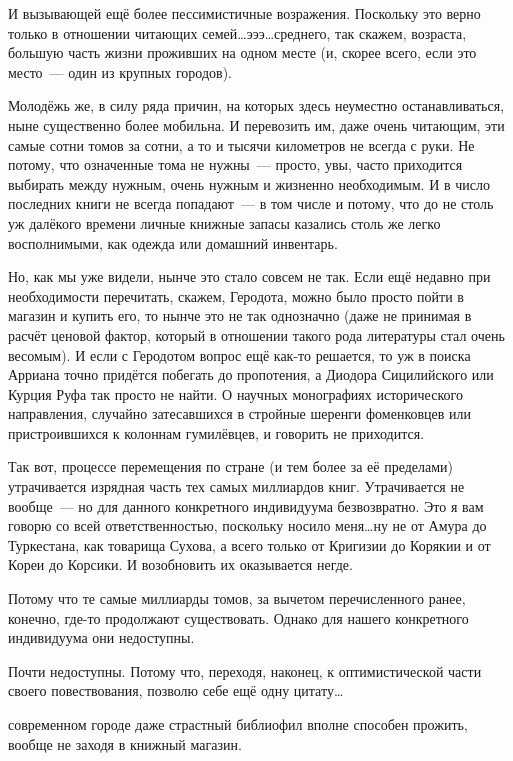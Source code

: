 И вызывающей ещё более пессимистичные возражения. Поскольку это верно только в отношении читающих семей\dots эээ\dots среднего, так скажем, возраста, большую часть жизни проживших на одном месте (и, скорее всего, если это место~--- один из крупных городов).

Молодёжь же, в силу ряда причин, на которых здесь неуместно останавливаться, ныне существенно более мобильна. И перевозить им, даже очень читающим, эти самые сотни томов за сотни, а то и тысячи километров не всегда с руки. Не потому, что означенные тома не нужны~--- просто, увы, часто приходится выбирать между нужным, очень нужным и жизненно необходимым. И в число последних книги не всегда попадают~--- в том числе и потому, что до не столь уж далёкого времени личные книжные запасы казались столь же легко восполнимыми, как одежда или домашний инвентарь.

Но, как мы уже видели, нынче это стало совсем не так. Если ещё недавно при необходимости перечитать, скажем, Геродота, можно было просто пойти в магазин и купить его, то нынче это не так однозначно (даже не принимая в расчёт ценовой фактор, который в отношении такого рода литературы стал очень весомым). И если с Геродотом вопрос ещё как-то решается, то уж в поиска Арриана точно придётся побегать до пропотения, а Диодора Сицилийского или Курция Руфа так просто не найти. О научных монографиях исторического направления, случайно затесавшихся в стройные шеренги фоменковцев или пристроившихся к колоннам гумилёвцев, и говорить не приходится.

Так вот, процессе перемещения по стране (и тем более за её пределами) утрачивается изрядная часть тех самых миллиардов книг. Утрачивается не вообще~--- но для данного конкретного индивидуума безвозвратно. Это я вам говорю со всей ответственностью, поскольку носило меня\dots ну не от Амура до Туркестана, как товарища Сухова, а всего только от Кригизии до Корякии и от Кореи до Корсики. И возобновить их оказывается негде.

Потому что те самые миллиарды томов, за вычетом перечисленного ранее, конечно, где-то продолжают существовать. Однако для нашего конкретного индивидуума они недоступны.

Почти недоступны. Потому что, переходя, наконец, к оптимистической части своего повествования, позволю себе ещё одну цитату\dots


\begin{shadequote}{}
 современном городе даже страстный библиофил вполне способен прожить, вообще не заходя в книжный магазин.
\end{shadequote}

